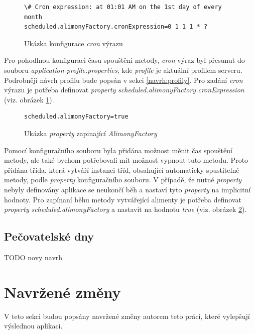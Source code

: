             \begin{figure}
                \begin{verbatim}
\# Cron expression: at 01:01 AM on the 1st day of every month
scheduled.alimonyFactory.cronExpression=0 1 1 1 * ?
                \end{verbatim}
                \caption{Ukázka konfigurace \textit{cron} výrazu} 
                \label{code:cron-expression}
            \end{figure}
            Pro pohodlnou konfiguraci času spouštěni metody, \textit{cron} výraz byl přesunut do souboru \textit{application-{profile}.properties}, kde \textit{profile} je aktuální profilem serveru. Podrobněji návrh profilu bude popsán v sekci \ref{navrh:profily}. Pro zadání \textit{cron} výrazu je potřeba definovat \textit{property} \textit{scheduled.alimonyFactory.cronExpression} (viz. obrázek \ref{code:cron-expression}).
            
            \begin{figure}
                \begin{verbatim}
scheduled.alimonyFactory=true
                \end{verbatim}
                \caption{Ukázka \textit{property} zapinající \textit{AlimonyFactory}} 
                \label{code:alimony-factory-true}
            \end{figure}
            Pomocí konfiguračního souboru byla přidána možnost měnit čas spouštění metody, ale také bychom potřebovali mít možnost vypnout tuto metodu. Proto přidána třída, která vytváří instanci tříd, obsahující automaticky spustitelné metody, podle \textit{property} konfiguračního souboru. V případě, že nutné \textit{property} nebyly definovány aplikace se neukončí běh a nastaví tyto \textit{property} na implicitní hodnoty. Pro zapínaní běhu metody vytvářející alimenty je potřeba definovat \textit{property} \textit{scheduled.alimonyFactory} a nastavit na hodnotu \textit{true} (viz. obrázek \ref{code:alimony-factory-true}).
        
        \subsection{Pečovatelské dny}\label{navrh:upravy:caredays}
            TODO novy navrh 
            
\section{Navržené změny}
    V teto sekci budou popsány navržené změny autorem teto práci, které vylepšují výslednou aplikaci.
    
